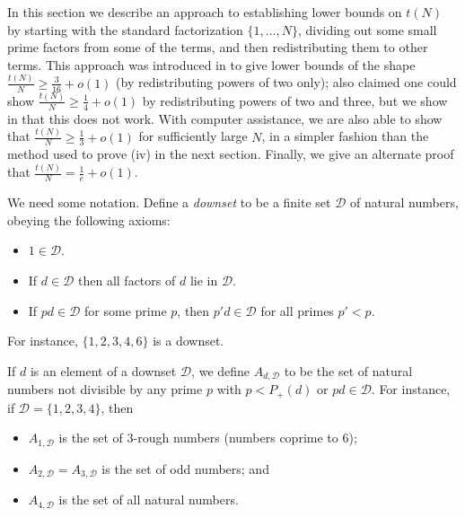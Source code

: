 \documentclass[10pt,a4paper,reqno]{amsart}
\numberwithin{equation}{section}
\theoremstyle{plain}
\theoremstyle{definition}
\begin{document}
In this section we describe an approach to establishing lower bounds on $t(N)$ by starting with the standard factorization $\{1,\dots,N\}$, dividing out some small prime factors from some of the terms, and then redistributing them to other terms.  This approach was introduced in \cite{guy-selfridge} to give lower bounds of the shape $\frac{t(N)}{N} \geq \frac{3}{16} + o(1)$ (by redistributing powers of two only); \cite{guy-selfridge} also claimed one could show $\frac{t(N)}{N} \geq \frac{1}{4} + o(1)$ by redistributing powers of two and three, but we show in  that this does not work.  With computer assistance, we are also able to show that $\frac{t(N)}{N} \geq \frac{1}{3}+o(1)$ for sufficiently large $N$, in a simpler fashion than the method used to prove (iv) in the next section.  Finally, we give an alternate proof that $\frac{t(N)}{N} = \frac{1}{e}+o(1)$.

We need some notation.  Define a \emph{downset} to be a finite set ${\mathcal D}$ of natural numbers, obeying the following axioms:
\begin{itemize}
  \item $1 \in {\mathcal D}$.
  \item If $d \in {\mathcal D}$ then all factors of $d$ lie in ${\mathcal D}$.
  \item If $pd \in {\mathcal D}$ for some prime $p$, then $p'd \in {\mathcal D}$ for all primes $p'<p$.
\end{itemize}
For instance, $\{1,2,3,4,6\}$ is a downset.  

If $d$ is an element of a downset ${\mathcal D}$, we define $A_{d,\mathcal{D}}$ to be the set of natural numbers not divisible by any prime $p$ with $p < P_+(d)$ or $pd \in \mathcal{D}$.  For instance, if ${\mathcal D} = \{1,2,3,4\}$, then
\begin{itemize}
\item $A_{1,{\mathcal D}}$ is the set of $3$-rough numbers (numbers coprime to $6$);
\item $A_{2,{\mathcal D}} = A_{3,{\mathcal D}}$ is the set of odd numbers; and
\item $A_{4,{\mathcal D}}$ is the set of all natural numbers.
\end{itemize}
\end{document}
